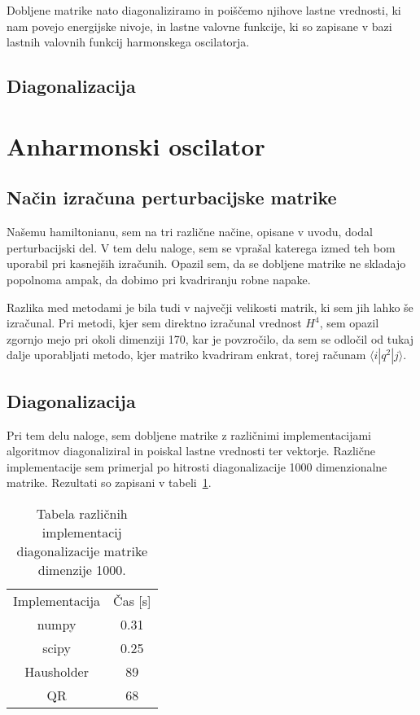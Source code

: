 \documentclass{porocilo}
\begin{document}
Dobljene matrike nato diagonaliziramo in poiščemo njihove lastne vrednosti, ki nam povejo energijske nivoje, in lastne valovne funkcije, ki so zapisane v bazi lastnih valovnih funkcij harmonskega oscilatorja.

\subsection{Diagonalizacija}

\newpage
\section{Anharmonski oscilator}
\subsection{Način izračuna perturbacijske matrike}
Našemu hamiltonianu, sem na tri različne načine, opisane v uvodu, dodal perturbacijski del. V tem delu naloge, sem se vprašal katerega izmed teh bom uporabil pri kasnejših izračunih. Opazil sem, da se dobljene matrike ne skladajo popolnoma ampak, da dobimo pri kvadriranju robne napake.


Razlika med metodami je bila tudi v največji velikosti matrik, ki sem jih lahko še izračunal. Pri metodi, kjer sem direktno izračunal vrednost $H^4$, sem opazil zgornjo mejo pri okoli dimenziji 170, kar je povzročilo, da sem se odločil od tukaj dalje uporabljati metodo, kjer matriko kvadriram enkrat, torej računam $\langle i|q^2|j\rangle$.

\subsection{Diagonalizacija}
Pri tem delu naloge, sem dobljene matrike z različnimi implementacijami algoritmov diagonaliziral in poiskal lastne vrednosti ter vektorje. Različne implementacije sem primerjal po hitrosti diagonalizacije 1000 dimenzionalne matrike. Rezultati so zapisani v tabeli~\ref{tab:times}.

\begin{table}
    \centering
    \caption{\label{tab:times} Tabela različnih implementacij diagonalizacije matrike dimenzije 1000.}
    \begin{tabular}{c c}
        Implementacija & Čas [s]    \\
        numpy          & \num{0.31} \\
        scipy          & \num{0.25} \\
        Hausholder     & \num{89}   \\
        QR             & \num{68}   \\
    \end{tabular}
\end{table}
\end{document}
